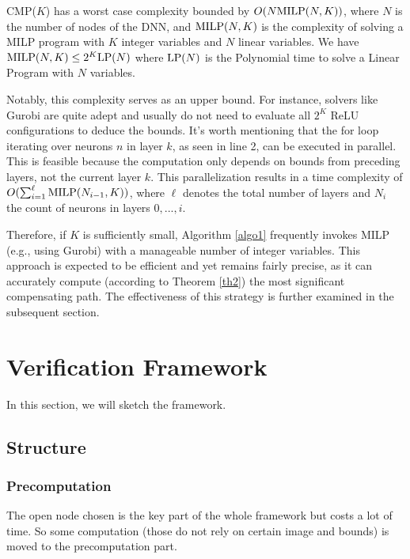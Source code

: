 CMP($K$) has a worst case complexity bounded by $O(N {\textrm{MILP}}(N,K))$, 
where $N$ is the number of nodes of the DNN, 
and ${\textrm{MILP}}(N,K)$ is the complexity of solving a MILP program with $K$ integer variables and $N$ linear variables.
We have ${\textrm{MILP}}(N,K) \leq 2^K {\textrm{LP}}(N)$ where ${\textrm{LP}}(N)$ is the Polynomial time to solve a Linear Program with $N$ variables.

Notably, this complexity serves as an upper bound. For instance, solvers like Gurobi are quite adept and usually do not need to evaluate all $2^K$ ReLU configurations to deduce the bounds.
It's worth mentioning that the for loop iterating over neurons $n$ in layer $k$, as seen in line 2, can be executed in parallel. This is feasible because the computation only depends on bounds from preceding layers, not the current layer $k$. This parallelization results in a time complexity of $O(\sum_{i=1}^{\ell} {\textrm{MILP}}(N_{i-1},K))$, where $\ell$ denotes the total number of layers and $N_i$ the count of neurons in layers $0, ..., i$.


Therefore, if $K$ is sufficiently small, Algorithm \ref{algo1} frequently invokes MILP (e.g., using Gurobi) with a manageable number of integer variables. This approach is expected to be efficient and yet remains fairly precise, as it can accurately compute (according to Theorem \ref{th2}) the most significant compensating path. The effectiveness of this strategy is further examined in the subsequent section.



\iffalse
\section{Verification Framework}




In this section, we will sketch the framework. 

\subsection{Structure}

\subsubsection*{Precomputation}

The open node chosen is the key part of the whole framework but costs a lot of time. So some computation (those do not rely on certain image and bounds) is moved to the precomputation part.

